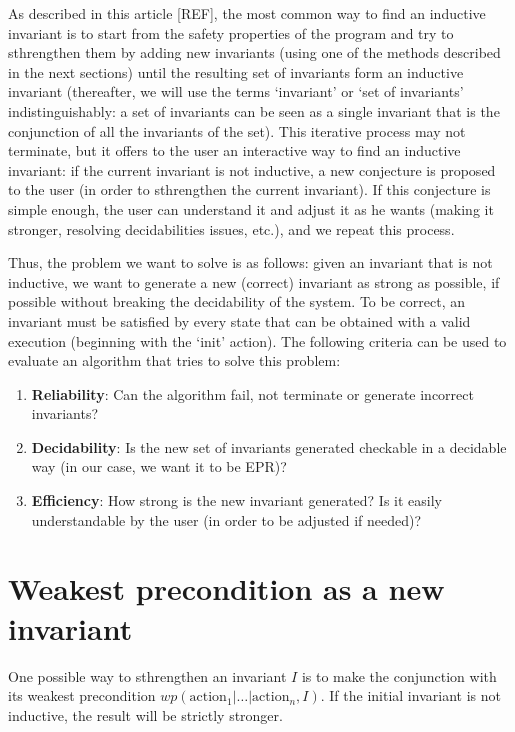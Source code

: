 \documentclass[11pt,a4paper,oldfontcommands,openany]{memoir}
\begin{document}
    As described in this article [REF], the most common way to find an inductive invariant is to start from the safety properties of the program
    and try to sthrengthen them by adding new invariants (using one of the methods described in the next sections) until the resulting set of invariants form an inductive invariant
    (thereafter, we will use the terms `invariant' or `set of invariants' indistinguishably: a set of invariants can be seen as a single invariant that is the conjunction of all the invariants of the set).
    This iterative process may not terminate, but it offers to the user an interactive way to find an inductive invariant:
    if the current invariant is not inductive, a new conjecture is proposed to the user (in order to sthrengthen the current invariant).
    If this conjecture is simple enough, the user can understand it and adjust it as he wants (making it stronger, resolving decidabilities issues, etc.), and we repeat this process.

    Thus, the problem we want to solve is as follows:
    given an invariant that is not inductive, we want to generate a new (correct) invariant as strong as possible, if possible without breaking the decidability of the system.
    To be correct, an invariant must be satisfied by every state that can be obtained with a valid execution (beginning with the `init' action).
    The following criteria can be used to evaluate an algorithm that tries to solve this problem:
    \begin{enumerate}
        \item \textbf{Reliability}: Can the algorithm fail, not terminate or generate incorrect invariants?
        \item \textbf{Decidability}: Is the new set of invariants generated checkable in a decidable way (in our case, we want it to be EPR)?
        \item \textbf{Efficiency}: How strong is the new invariant generated? Is it easily understandable by the user (in order to be adjusted if needed)?
    \end{enumerate}

    \section{Weakest precondition as a new invariant}

    One possible way to sthrengthen an invariant \(I\) is to make the conjunction with its weakest precondition \(wp(\text{action}_1|\ldots|\text{action}_n,I)\).
    If the initial invariant is not inductive, the result will be strictly stronger.
\end{document}
